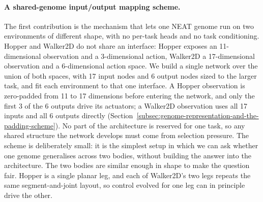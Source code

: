 \documentclass[12pt]{article}
\begin{document}
\paragraph{A shared-genome input/output mapping scheme.}
The first contribution is the mechanism that lets one NEAT genome run on two environments of different shape, with no per-task heads and no task conditioning.
Hopper and Walker2D do not share an interface: Hopper exposes an 11-dimensional observation and a 3-dimensional action, Walker2D a 17-dimensional observation and a 6-dimensional action space.
We build a single network over the union of both spaces, with 17 input nodes and 6 output nodes sized to the larger task, and fit each environment to that one interface.
A Hopper observation is zero-padded from 11 to 17 dimensions before entering the network, and only the first 3 of the 6 outputs drive its actuators; a Walker2D observation uses all 17 inputs and all 6 outputs directly (Section~\ref{subsec:genome-representation-and-the-padding-scheme}).
No part of the architecture is reserved for one task, so any shared structure the network develops must come from selection pressure.
The scheme is deliberately small: it is the simplest setup in which we can ask whether one genome generalises across two bodies, without building the answer into the architecture.
The two bodies are similar enough in shape to make the question fair.
Hopper is a single planar leg, and each of Walker2D's two legs repeats the same segment-and-joint layout, so control evolved for one leg can in principle drive the other.
\end{document}
